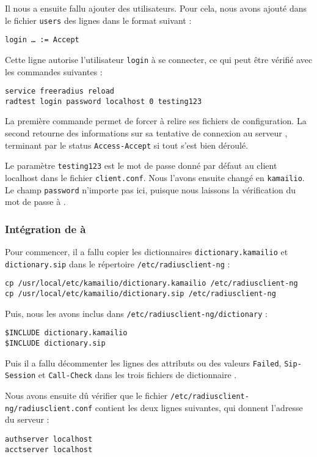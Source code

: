 Il nous a ensuite fallu ajouter des utilisateurs. Pour cela, nous avons ajouté dans le fichier \texttt{users} des lignes dans le format suivant :

\begin{verbatim}
login … := Accept
\end{verbatim}

Cette ligne autorise l'utilisateur \texttt{login} à se connecter, ce qui peut être vérifié avec les commandes suivantes :

\begin{verbatim}
service freeradius reload
radtest login password localhost 0 testing123
\end{verbatim}

La première commande permet de forcer {\frad} à relire ses fichiers de configuration. La second retourne des informations sur sa tentative de connexion au serveur {\frad}, terminant par le status \texttt{Access-Accept} si tout s’est bien déroulé.

Le paramètre \texttt{testing123} est le mot de passe donné par défaut au client localhost dans le fichier \texttt{client.conf}. Nous l'avons ensuite changé en \texttt{kamailio}. Le champ \texttt{password} n’importe pas ici, puisque nous laissons la vérification du mot de passe à {\kam}.

\subsubsection{Intégration de {\rad} à {\kam}}

Pour commencer, il a fallu copier les dictionnaires {\rad} \texttt{dictionary.kamailio} et \texttt{dictionary.sip} dans le répertoire \texttt{/etc/radiusclient-ng} :

\begin{verbatim}
cp /usr/local/etc/kamailio/dictionary.kamailio /etc/radiusclient-ng
cp /usr/local/etc/kamailio/dictionary.sip /etc/radiusclient-ng
\end{verbatim}

Puis, nous les avons inclus dans \texttt{/etc/radiusclient-ng/dictionary} :

\begin{verbatim}
$INCLUDE dictionary.kamailio
$INCLUDE dictionary.sip
\end{verbatim}

Puis il a fallu décommenter les lignes des attributs ou des valeurs \texttt{Failed}, \texttt{Sip-Session} et \texttt{Call-Check} dans les trois fichiers de dictionnaire {\rad}.

Nous avons ensuite dû vérifier que le fichier \texttt{/etc/radiusclient-ng/radiusclient.conf} contient les deux lignes suivantes, qui donnent l'adresse du serveur {\rad} :

\begin{verbatim}
authserver localhost
acctserver localhost
\end{verbatim}

